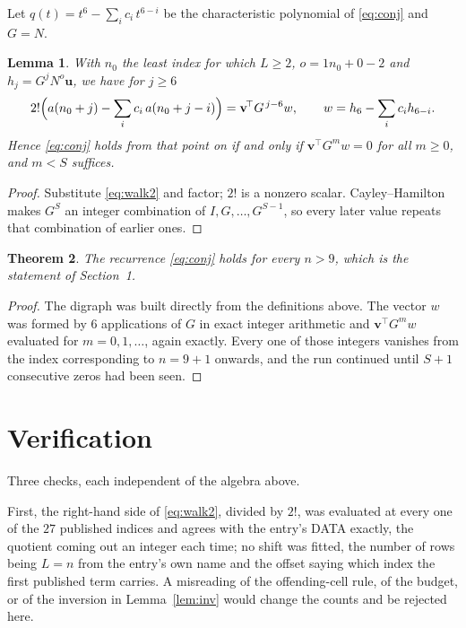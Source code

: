 \documentclass[11pt,a4paper]{article}
\theoremstyle{plain}
\newtheorem{theorem}{Theorem}
\newtheorem{lemma}[theorem]{Lemma}
\theoremstyle{definition}
\begin{document}
Let $q(t)=t^{6}-\sum_i c_i\,t^{6-i}$ be the characteristic polynomial of
\eqref{eq:conj} and $G=N$.

\begin{lemma}\label{lem:crit}
With $n_0$ the least index for which $L\ge2$, $o=1n_0+0-2$ and
$h_j=G^{j}N^{o}\mathbf{u}$, we have for $j\ge6$
\[
2!\Bigl(a(n_0+j)-\sum_i c_i\,a(n_0+j-i)\Bigr)=\mathbf{v}^{\!\top}G^{\,j-6}w,
\qquad w=h_{6}-\sum_i c_i h_{6-i} .
\]
Hence \eqref{eq:conj} holds from that point on if and only if
$\mathbf{v}^{\!\top}G^{m}w=0$ for all $m\ge0$, and $m<S$ suffices.
\end{lemma}

\begin{proof}
Substitute \eqref{eq:walk2} and factor; $2!$ is a nonzero scalar. Cayley--Hamilton
makes $G^{S}$ an integer combination of $I,G,\dots,G^{S-1}$, so every later value repeats
that combination of earlier ones.
\end{proof}

\begin{theorem}
The recurrence \eqref{eq:conj} holds for every $n>9$, which is the statement of
Section~1.
\end{theorem}

\begin{proof}
The digraph was built directly from the definitions above. The vector $w$ was formed by
$6$ applications of $G$ in exact integer arithmetic and $\mathbf{v}^{\!\top}G^{m}w$
evaluated for $m=0,1,\dots$, again exactly. Every one of those integers vanishes from the
index corresponding to $n=9+1$ onwards, and the run continued until $S+1$ consecutive
zeros had been seen.
\end{proof}

\section{Verification}

Three checks, each independent of the algebra above.

First, the right-hand side of \eqref{eq:walk2}, divided by $2!$, was evaluated at every
one of the $27$ published indices and agrees with the entry's DATA exactly, the quotient
coming out an integer each time; no shift was fitted, the number of rows being
$L=n$ from the entry's own name and the offset saying which index the first published
term carries. A misreading of the offending-cell rule, of the budget, or of the inversion in
Lemma~\ref{lem:inv} would change the counts and be rejected here.
\end{document}
